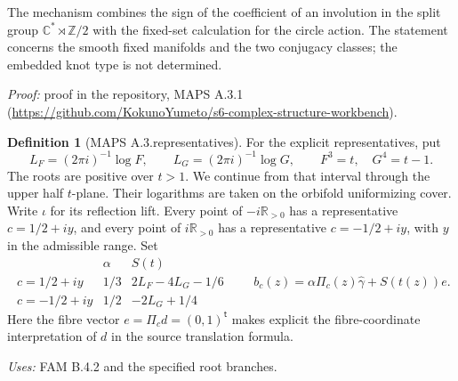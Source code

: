\documentclass[11pt,a4paper]{article}
\theoremstyle{plain}
\theoremstyle{definition}
\newtheorem{definition}[theorem]{Definition}
\newcommand{\R}{\mathbb R}
\begin{document}
The mechanism combines the sign of the coefficient of an involution in the split group $\mathbb C^*\rtimes\mathbb Z/2$ with the fixed-set calculation for the circle action. The statement concerns the smooth fixed manifolds and the two conjugacy classes; the embedded knot type is not determined.

\noindent\emph{Proof:} proof in the repository, MAPS A.3.1 (\url{https://github.com/KokunoYumeto/s6-complex-structure-workbench}).

\begin{definition}[MAPS A.3.representatives]\label{maps:A.3.representatives}
For the explicit representatives, put
\[
 L_F=(2\pi i)^{-1}\log F,\qquad L_G=(2\pi i)^{-1}\log G,
 \qquad F^3=t,\quad G^4=t-1.
 \tag{MAPS A.3.1}
\]
The roots are positive over $t>1$. We continue from that interval
through the upper half $t$-plane. Their logarithms are taken on the
orbifold uniformizing cover. Write $\iota$ for its reflection lift.
Every point of $-i\R_{>0}$ has a representative $c=1/2+iy$, and every
point of $i\R_{>0}$ has a representative $c=-1/2+iy$, with $y$ in the
admissible range. Set
\[
\begin{array}{c|c|c}
 &\alpha&S(t)\\\hline
 c=1/2+iy&1/3&2L_F-4L_G-1/6\\
 c=-1/2+iy&1/2&-2L_G+1/4
\end{array}
\qquad b_c(z)=\alpha\Pi_c(z)\widehat\gamma+S(t(z))e.
\tag{MAPS A.3.2}
\]
Here the fibre vector $e=\Pi_c d=(0,1)^{\mathsf t}$ makes explicit the fibre-coordinate interpretation of $d$ in the source translation formula.
\end{definition}
\noindent\emph{Uses:} FAM B.4.2 and the specified root branches.\par
\end{document}
